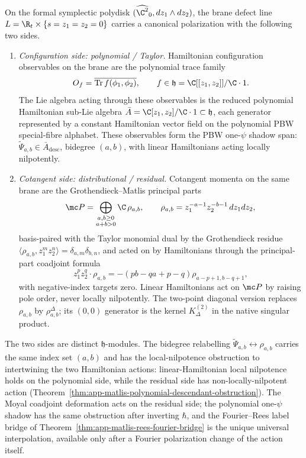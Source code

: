 \begin{thm}
\label{thm:app-defect-polarization}
  On the formal symplectic polydisk \((\widehat{\C^2}_0,dz_1\wedge dz_2)\),
  the brane defect line \(L=\R_t\times\{s=z_1=z_2=0\}\) carries a
  canonical polarization with the following two sides.
  \begin{enumerate}
    \item \emph{Configuration side: polynomial / Taylor.}  Hamiltonian
      configuration observables on the brane are the polynomial trace
      family
      \[
        O_f=\overline{\operatorname{Tr}f(\phi_1,\phi_2)},\qquad
        f\in\mathfrak h=\C[[z_1,z_2]]/\C\cdot1 .
      \]
      The Lie algebra acting through these observables is the reduced
      polynomial Hamiltonian sub-Lie algebra
      \(\bar A=\C[z_1,z_2]/\C\cdot1\subset\mathfrak h\), each generator
      represented by a constant Hamiltonian vector field on the
      polynomial PBW special-fibre alphabet.  These observables form the
      PBW one-\(\psi\) shadow span:
      \(\widetilde\Psi_{a,b}\in\bar A_{\mathrm{desc}}\), bidegree
      \((a,b)\), with linear Hamiltonians acting locally nilpotently.
    \item \emph{Cotangent side: distributional / residual.}  Cotangent
      momenta on the same brane are the Grothendieck--Matlis principal
      parts
      \[
        \mc P=\bigoplus_{\substack{a,b\geq0\\a+b>0}}\C\,\rho_{a,b},
        \qquad
        \rho_{a,b}=z_1^{-a-1}z_2^{-b-1}\,dz_1dz_2,
      \]
      basis-paired with the Taylor monomial dual by the Grothendieck
      residue
      \(\langle\rho_{a,b},z_1^m z_2^n\rangle=\delta_{a,m}\delta_{b,n}\),
      and acted on by Hamiltonians through the principal-part coadjoint
      formula
      \[
        z_1^p z_2^q\cdot\rho_{a,b}
          =-(pb-qa+p-q)\rho_{a-p+1,b-q+1},
      \]
      with negative-index targets zero.  Linear Hamiltonians act on
      \(\mc P\) by raising pole order, never locally nilpotently.
      The two-point diagonal version replaces \(\rho_{a,b}\) by
      \(\rho^\Delta_{a,b}\); its \((0,0)\) generator is the kernel
      \(K^{(2)}_\Delta\) in the native singular product.
  \end{enumerate}
  The two sides are distinct \(\mathfrak h\)-modules.  The
  bidegree relabelling
  \(\widetilde\Psi_{a,b}\leftrightarrow\rho_{a,b}\) carries the same
  index set \((a,b)\) and has the local-nilpotence obstruction to
  intertwining the two Hamiltonian actions: linear-Hamiltonian local
  nilpotence holds on the polynomial side, while the residual side has
  non-locally-nilpotent action
  (Theorem~\ref{thm:app-matlis-polynomial-descendant-obstruction}).  The
  Moyal coadjoint deformation acts on the residual side; the polynomial
  one-\(\psi\) shadow has the same obstruction after inverting
  \(\hbar\), and the Fourier--Rees label bridge of
  Theorem~\ref{thm:app-matlis-rees-fourier-bridge} is the unique
  universal interpolation, available only after a Fourier polarization
  change of the action itself.


\end{thm}
